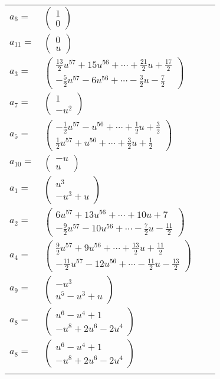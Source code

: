\documentclass[1p]{elsarticle_modified}
\theoremstyle{definition}
\begin{document}
\begin{tabular}{m{7pt} m{180pt} m{7pt} m{180pt} }
\flushright $a_{6}=$&$\begin{pmatrix}1\\0\end{pmatrix}$ \\
\flushright $a_{11}=$&$\begin{pmatrix}0\\u\end{pmatrix}$ \\
\flushright $a_{3}=$&$\begin{pmatrix}\frac{13}{2} u^{57}+15 u^{56}+\cdots+\frac{21}{2} u+\frac{17}{2}\\-\frac{5}{2} u^{57}-6 u^{56}+\cdots-\frac{3}{2} u-\frac{7}{2}\end{pmatrix}$ \\
\flushright $a_{7}=$&$\begin{pmatrix}1\\- u^2\end{pmatrix}$ \\
\flushright $a_{5}=$&$\begin{pmatrix}-\frac{1}{2} u^{57}- u^{56}+\cdots+\frac{1}{2} u+\frac{3}{2}\\\frac{1}{2} u^{57}+u^{56}+\cdots+\frac{3}{2} u+\frac{1}{2}\end{pmatrix}$ \\
\flushright $a_{10}=$&$\begin{pmatrix}- u\\u\end{pmatrix}$ \\
\flushright $a_{1}=$&$\begin{pmatrix}u^3\\- u^3+u\end{pmatrix}$ \\
\flushright $a_{2}=$&$\begin{pmatrix}6 u^{57}+13 u^{56}+\cdots+10 u+7\\-\frac{9}{2} u^{57}-10 u^{56}+\cdots-\frac{7}{2} u-\frac{11}{2}\end{pmatrix}$ \\
\flushright $a_{4}=$&$\begin{pmatrix}\frac{9}{2} u^{57}+9 u^{56}+\cdots+\frac{13}{2} u+\frac{11}{2}\\-\frac{11}{2} u^{57}-12 u^{56}+\cdots-\frac{11}{2} u-\frac{13}{2}\end{pmatrix}$ \\
\flushright $a_{9}=$&$\begin{pmatrix}- u^3\\u^5- u^3+u\end{pmatrix}$ \\
\flushright $a_{8}=$&$\begin{pmatrix}u^6- u^4+1\\- u^8+2 u^6-2 u^4\end{pmatrix}$\\ \flushright $a_{8}=$&$\begin{pmatrix}u^6- u^4+1\\- u^8+2 u^6-2 u^4\end{pmatrix}$\\&\end{tabular}
\end{document}
